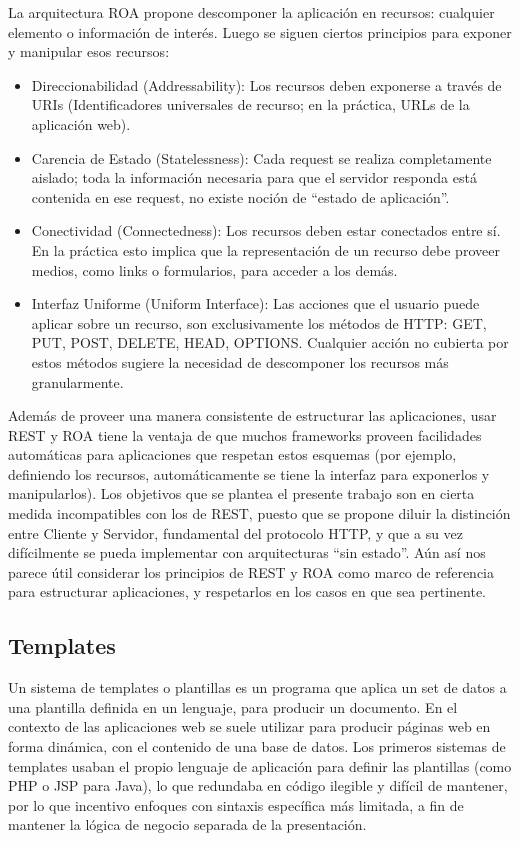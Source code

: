 \documentclass[doc,helv,longtable]{article}
\begin{document}
La arquitectura ROA propone descomponer la aplicación en recursos: cualquier elemento o información de interés. Luego se siguen ciertos principios para exponer y manipular esos recursos:
\begin{itemize}
\item  Direccionabilidad (Addressability): Los recursos deben exponerse a través de URIs (Identificadores universales de recurso; en la práctica, URLs de la aplicación web).
\item  Carencia de Estado (Statelessness): Cada request se realiza completamente aislado; toda la información necesaria para que el servidor responda está contenida en ese request, no existe noción de “estado de aplicación”.
\item  Conectividad (Connectedness): Los recursos deben estar conectados entre sí. En la práctica esto implica que la representación de un recurso debe proveer medios, como links o formularios, para acceder a los demás.
\item  Interfaz Uniforme (Uniform Interface): Las acciones que el usuario puede aplicar sobre un recurso, son exclusivamente los métodos de HTTP: GET, PUT, POST, DELETE, HEAD, OPTIONS. Cualquier acción no cubierta por estos métodos sugiere la necesidad de descomponer los recursos más granularmente.

\end{itemize}

Además de proveer una manera consistente de estructurar las aplicaciones, usar REST y ROA tiene la ventaja de que muchos frameworks proveen facilidades automáticas para aplicaciones que respetan estos esquemas (por ejemplo, definiendo los recursos, automáticamente se tiene la interfaz para exponerlos y manipularlos). Los objetivos que se plantea el presente trabajo son en cierta medida incompatibles con los de REST, puesto que se propone diluir la distinción entre Cliente y Servidor, fundamental del protocolo HTTP, y que a su vez difícilmente se pueda implementar con arquitecturas “sin estado”. Aún así nos parece útil considerar los principios de REST y ROA como marco de referencia para estructurar aplicaciones, y respetarlos en los casos en que sea pertinente.

\subsection{Templates}
Un sistema de templates o plantillas es un programa que aplica un set de datos a una plantilla definida en un lenguaje, para producir un documento. En el contexto de las aplicaciones web se suele utilizar para producir páginas web en forma dinámica, con el contenido de una base de datos\cite{template}. Los primeros sistemas de templates usaban el propio lenguaje de aplicación para definir las plantillas (como PHP o JSP para Java), lo que redundaba en código ilegible y difícil de mantener, por lo que incentivo enfoques con sintaxis específica más limitada, a fin de mantener la lógica de negocio separada de la presentación\cite{logicless1}\cite{logicless2}.
\end{document}
